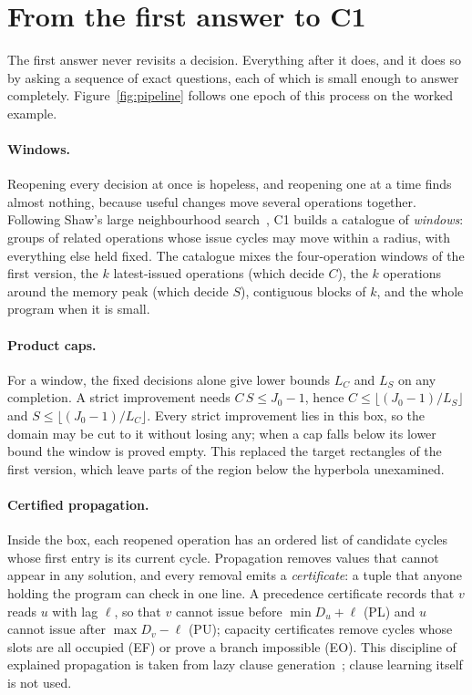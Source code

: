 \documentclass[11pt,a4paper]{article}
\begin{document}
\section{From the first answer to C1}\label{sec:c1}

The first answer never revisits a decision. Everything after it does, and it does
so by asking a sequence of exact questions, each of which is small enough to
answer completely. Figure~\ref{fig:pipeline} follows one epoch of this process
on the worked example.

\paragraph{Windows.} Reopening every decision at once is hopeless, and reopening
one at a time finds almost nothing, because useful changes move several
operations together. Following Shaw's large neighbourhood search~\cite{shaw1998},
C1 builds a catalogue of \emph{windows}: groups of related operations whose issue
cycles may move within a radius, with everything else held fixed. The catalogue
mixes the four-operation windows of the first version, the $k$ latest-issued
operations (which decide $C$), the $k$ operations around the memory peak (which
decide $S$), contiguous blocks of $k$, and the whole program when it is small.

\paragraph{Product caps.} For a window, the fixed decisions alone give lower
bounds $L_C$ and $L_S$ on any completion. A strict improvement needs
$C\,S\leq J_0-1$, hence $C\leq\lfloor (J_0-1)/L_S\rfloor$ and
$S\leq\lfloor (J_0-1)/L_C\rfloor$. Every strict improvement lies in this box, so
the domain may be cut to it without losing any; when a cap falls below its lower
bound the window is proved empty. This replaced the target rectangles of the
first version, which leave parts of the region below the hyperbola unexamined.

\paragraph{Certified propagation.} Inside the box, each reopened operation has an
ordered list of candidate cycles whose first entry is its current cycle.
Propagation removes values that cannot appear in any solution, and every removal
emits a \emph{certificate}: a tuple that anyone holding the program can check in
one line. A precedence certificate records that $v$ reads $u$ with lag $\ell$, so
that $v$ cannot issue before $\min D_u+\ell$ (\textsf{PL}) and $u$ cannot issue
after $\max D_v-\ell$ (\textsf{PU}); capacity certificates remove cycles whose
slots are all occupied (\textsf{EF}) or prove a branch impossible (\textsf{EO}).
This discipline of explained propagation is taken from lazy clause
generation~\cite{ohrimenko2009}; clause learning itself is not used.
\end{document}
